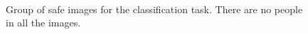 \begin{figure}
    \\
    \vspace{\subfigurevspacing}
    \hspace{\subfigurehspacing}
    \vspace{0.1cm}
    \caption[Group of safe images for the classification task]
    {Group of safe images for the classification task. There are no people in all the images.}
    \label{fig:sub_dangerous_group}
\end{figure}
